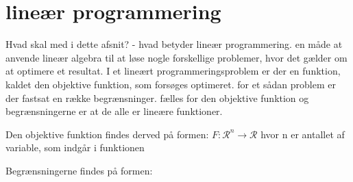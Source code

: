 \chapter{lineær programmering}


Hvad skal med i dette afsnit?
- hvad betyder lineær programmering.
	en måde at anvende lineær algebra til at løse nogle forskellige problemer, hvor det gælder om at optimere et resultat.
	I et lineært programmeringsproblem er der en funktion, kaldet den objektive funktion, som forsøges optimeret.
	for et sådan problem er der fastsat en række begrænsninger. 
	fælles for den objektive funktion og begrænsningerne er at de alle er lineære funktioner. 
	
Den objektive funktion findes derved på formen:
$ F: \mathcal{R}^n \rightarrow \mathcal{R} 
$ hvor n er antallet af variable, som indgår i funktionen

Begrænsningerne findes på formen:


